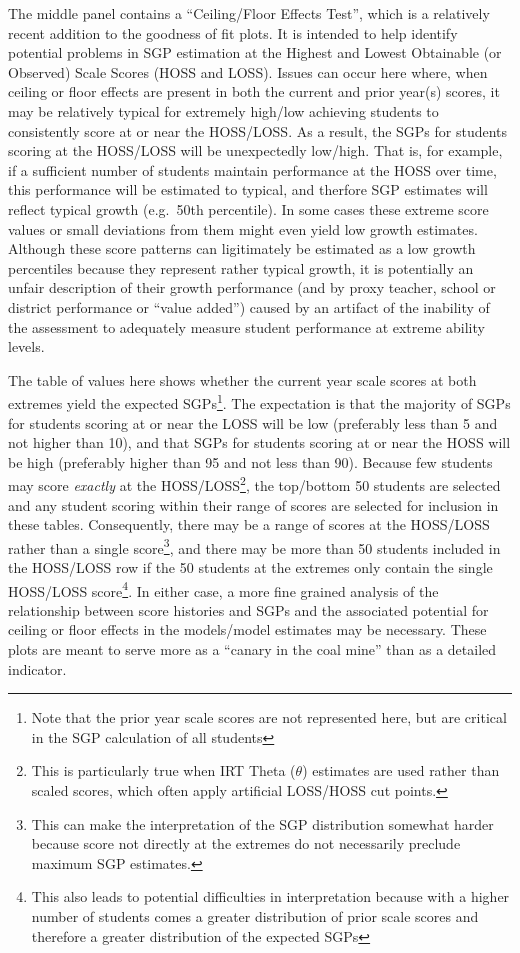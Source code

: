 \documentclass[12pt]{article}
\begin{document}
The middle panel contains a ``Ceiling/Floor Effects Test'', which is a
relatively recent addition to the goodness of fit plots. It is intended
to help identify potential problems in SGP estimation at the Highest and
Lowest Obtainable (or Observed) Scale Scores (HOSS and LOSS). Issues can
occur here where, when ceiling or floor effects are present in both the
current and prior year(s) scores, it may be relatively typical for
extremely high/low achieving students to consistently score at or near
the HOSS/LOSS. As a result, the SGPs for students scoring at the
HOSS/LOSS will be unexpectedly low/high. That is, for example, if a
sufficient number of students maintain performance at the HOSS over
time, this performance will be estimated to typical, and therfore SGP
estimates will reflect typical growth (e.g.~50th percentile). In some
cases these extreme score values or small deviations from them might
even yield low growth estimates. Although these score patterns can
ligitimately be estimated as a low growth percentiles because they
represent rather typical growth, it is potentially an unfair description
of their growth performance (and by proxy teacher, school or district
performance or ``value added'') caused by an artifact of the inability
of the assessment to adequately measure student performance at extreme
ability levels.

The table of values here shows whether the current year scale scores at
both extremes yield the expected SGPs\footnote{Note that the prior year
  scale scores are not represented here, but are critical in the SGP
  calculation of all students}. The expectation is that the majority of
SGPs for students scoring at or near the LOSS will be low (preferably
less than 5 and not higher than 10), and that SGPs for students scoring
at or near the HOSS will be high (preferably higher than 95 and not less
than 90). Because few students may score \emph{exactly} at the
HOSS/LOSS\footnote{This is particularly true when IRT Theta (\(\theta\))
  estimates are used rather than scaled scores, which often apply
  artificial LOSS/HOSS cut points.}, the top/bottom 50 students are
selected and any student scoring within their range of scores are
selected for inclusion in these tables. Consequently, there may be a
range of scores at the HOSS/LOSS rather than a single score\footnote{This
  can make the interpretation of the SGP distribution somewhat harder
  because score not directly at the extremes do not necessarily preclude
  maximum SGP estimates.}, and there may be more than 50 students
included in the HOSS/LOSS row if the 50 students at the extremes only
contain the single HOSS/LOSS score\footnote{This also leads to potential
  difficulties in interpretation because with a higher number of
  students comes a greater distribution of prior scale scores and
  therefore a greater distribution of the expected SGPs}. In either
case, a more fine grained analysis of the relationship between score
histories and SGPs and the associated potential for ceiling or floor
effects in the models/model estimates may be necessary. These plots are
meant to serve more as a ``canary in the coal mine'' than as a detailed
indicator.
\end{document}
